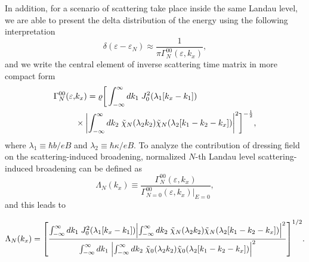 In addition, for a scenario of scattering take place inside the same Landau level, we are able to present the delta distribution of the energy using the following interpretation \cite{dini16}
\begin{equation} \label{eq_16}
 \delta(\varepsilon - \varepsilon_{N}) \approx
 \frac{1}{\pi \Gamma^{00}_{N}(\varepsilon,k_x)},
\end{equation}
and we write the central element of inverse scattering time matrix in more compact form
\begin{equation} \label{eq_17}
  \begin{aligned}
    \Gamma^{00}_{N}(\varepsilon,& k_x) =
    \varrho
    \bigg[
    \int_{-\infty}^{\infty} d {k}_1 \;
    J_0^2\qty(\lambda_1[{k}_x - {k}_1]) \\
    & \times
    \qty|
    \int_{-\infty}^{\infty} d{k}_2 \;
    \tilde{\chi}_{N}\qty(\lambda_2 k_2)
    \tilde{\chi}_{N}\qty(\lambda_2 \qty[{k}_1 - {k}_2 - {k}_x])|^2
    \bigg]^{-\frac{1}{2}},
  \end{aligned}
\end{equation}
where $ \lambda_1 \equiv \hbar b/eB$ and  $\lambda_2 \equiv \hbar \kappa/eB$.
To analyze the contribution of dressing field on the scattering-induced broadening, normalized $N$-th Landau level scattering-induced broadening can be defined as
\begin{equation} \label{eq_18}
    \Lambda_N(k_x) \equiv
    \frac{\Gamma^{00}_{N}(\varepsilon,k_x)}{\Gamma^{00}_{N=0}(\varepsilon,k_x)\big|_{E=0}},
\end{equation}
and this leads to
\begin{widetext}
\begin{equation} \label{eq_19}
    \Lambda_N (k_x) =
    \qty[
    \frac
    {\int_{-\infty}^{\infty} d {k}_1 \;
    J_0^2\qty(\lambda_1[{k}_x - {k}_1])
    \qty|
    \int_{-\infty}^{\infty} d{k}_2 \;
    \tilde{\chi}_{N}\qty(\lambda_2 k_2)
    \tilde{\chi}_{N}\qty(\lambda_2 \qty[{k}_1 - {k}_2 - {k}_x])|^2}
    {\int_{-\infty}^{\infty} d {k}_1 \;
    \qty|
    \int_{-\infty}^{\infty} d{k}_2 \;
    \tilde{\chi}_{0}\qty(\lambda_2 k_2)
    \tilde{\chi}_{0}\qty(\lambda_2 \qty[{k}_1 - {k}_2 - {k}_x])|^2}
    ]^{1/2}.
\end{equation}
\end{widetext}

